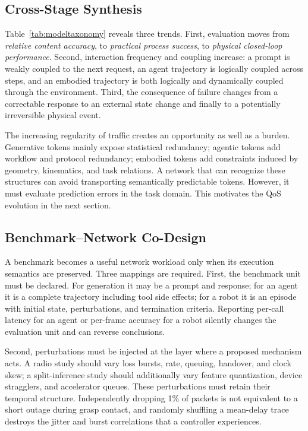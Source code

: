 \documentclass[letterpaper,journal]{IEEEtran}
\begin{document}
\subsection{Cross-Stage Synthesis}
Table~\ref{tab:modeltaxonomy} reveals three trends. First, evaluation moves
from \emph{relative content accuracy}, to \emph{practical process success}, to
\emph{physical closed-loop performance}. Second, interaction frequency and
coupling increase: a prompt is weakly coupled to the next request, an agent
trajectory is logically coupled across steps, and an embodied trajectory is
both logically and dynamically coupled through the environment. Third, the
consequence of failure changes from a correctable response to an external
state change and finally to a potentially irreversible physical event.

The increasing regularity of traffic creates an opportunity as well as a
burden. Generative tokens mainly expose statistical redundancy; agentic tokens
add workflow and protocol redundancy; embodied tokens add constraints induced
by geometry, kinematics, and task relations. A network that can recognize
these structures can avoid transporting semantically predictable tokens.
However, it must evaluate prediction errors in the task domain. This motivates
the QoS evolution in the next section.

\subsection{Benchmark--Network Co-Design}
A benchmark becomes a useful network workload only when its execution
semantics are preserved. Three mappings are required. First, the benchmark
unit must be declared. For generation it may be a prompt and response; for an
agent it is a complete trajectory including tool side effects; for a robot it
is an episode with initial state, perturbations, and termination criteria.
Reporting per-call latency for an agent or per-frame accuracy for a robot
silently changes the evaluation unit and can reverse conclusions.

Second, perturbations must be injected at the layer where a proposed mechanism
acts. A radio study should vary loss bursts, rate, queuing, handover, and clock
skew; a split-inference study should additionally vary feature quantization,
device stragglers, and accelerator queues. These perturbations must retain
their temporal structure. Independently dropping 1\% of packets is not
equivalent to a short outage during grasp contact, and randomly shuffling a
mean-delay trace destroys the jitter and burst correlations that a controller
experiences.
\end{document}
